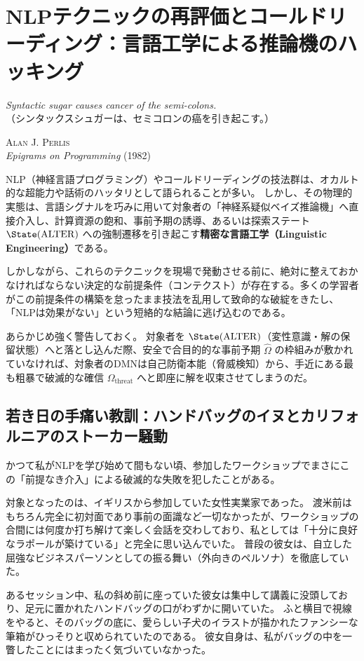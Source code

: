 \chapter{NLPテクニックの再評価とコールドリーディング：言語工学による推論機のハッキング}
\epigraph{%
  \textit{Syntactic sugar causes cancer of the semi-colons.}\\
  \vspace{2pt}
  \footnotesize （シンタックスシュガーは、セミコロンの癌を引き起こす。）
}{%
  \textsc{Alan J. Perlis}\\
  \footnotesize \textit{Epigrams on Programming} (1982)
}
NLP（神経言語プログラミング）やコールドリーディングの技法群は、オカルト的な超能力や話術のハッタリとして語られることが多い。
しかし、その物理的実態は、言語シグナルを巧みに用いて対象者の「神経系疑似ベイズ推論機」へ直接介入し、計算資源の飽和、事前予期の誘導、あるいは探索ステート $\State(\mathrm{ALTER})$ への強制遷移を引き起こす\textbf{精密な言語工学（Linguistic Engineering）}である。

しかしながら、これらのテクニックを現場で発動させる前に、絶対に整えておかなければならない決定的な前提条件（コンテクスト）が存在する。多くの学習者がこの前提条件の構築を怠ったまま技法を乱用して致命的な破綻をきたし、「NLPは効果がない」という短絡的な結論に逃げ込むのである。

あらかじめ強く警告しておく。
対象者を $\State(\mathrm{ALTER})$（変性意識・解の保留状態）へと落とし込んだ際、安全で合目的的な事前予期 $\hat{\Omega}$ の枠組みが敷かれていなければ、対象者のDMNは自己防衛本能（脅威検知）から、手近にある最も粗暴で破滅的な確信 $\Omega_{\mathrm{threat}}$ へと即座に解を収束させてしまうのだ。

\section{若き日の手痛い教訓：ハンドバッグのイヌとカリフォルニアのストーカー騒動}

かつて私がNLPを学び始めて間もない頃、参加したワークショップでまさにこの「前提なき介入」による破滅的な失敗を犯したことがある。

対象となったのは、イギリスから参加していた女性実業家であった。
渡米前はもちろん完全に初対面であり事前の面識など一切なかったが、ワークショップの合間には何度か打ち解けて楽しく会話を交わしており、私としては「十分に良好なラポールが築けている」と完全に思い込んでいた。
普段の彼女は、自立した屈強なビジネスパーソンとしての振る舞い（外向きのペルソナ）を徹底していた。

あるセッション中、私の斜め前に座っていた彼女は集中して講義に没頭しており、足元に置かれたハンドバッグの口がわずかに開いていた。
ふと横目で視線をやると、そのバッグの底に、愛らしい子犬のイラストが描かれたファンシーな筆箱がひっそりと収められていたのである。
彼女自身は、私がバッグの中を一瞥したことにはまったく気づいていなかった。

